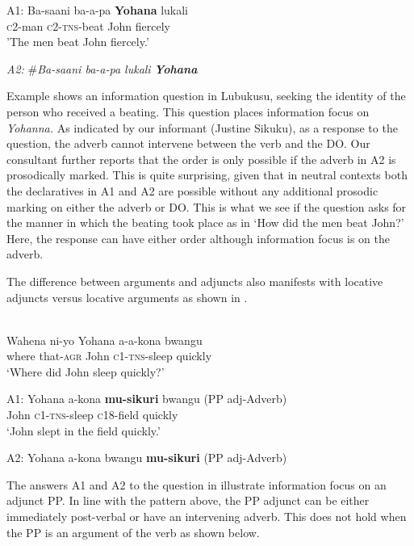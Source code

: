 \documentclass[output=paper]{langsci/langscibook}
\begin{document}
\ea\label{ex:}
\gll A1:  Ba-saani  ba-a-pa  \textbf{{Yohana}}{  lukali}      \\
       \textsc{c}2-man   \textsc{c2-tns}-beat   John     fiercely\\
\glt    'The men beat John fiercely.'

\textit{A2:}  \#\textit{Ba-saani  ba-a-pa  lukali}    \textbf{\textit{Yohana}}    
\z


Example  shows an information question in Lubukusu, seeking the identity of the person who received a beating. This question places information focus on \textit{Yohanna.} As indicated by our informant (Justine Sikuku), as a response to the question, the adverb cannot intervene between the verb and the DO. Our consultant further reports that the order is only possible if the adverb in A2 is prosodically marked. This is quite surprising, given that in neutral contexts both the declaratives in A1 and A2 are possible without any additional prosodic marking on either the adverb or DO. This is what we see if the question asks for the manner in which the beating took place as in ‘How did the men beat John?’ Here, the response can have either order although information focus is on the adverb. 

The difference between arguments and adjuncts also manifests with locative adjuncts versus locative arguments as shown in .  


\ea\label{ex:}
  \\
\gll Wahena  ni-yo    Yohana  a-a-kona  bwangu \\
where     that-\textsc{agr}   John     \textsc{c1-tns}-sleep  quickly \\
\glt ‘Where did John sleep quickly?’ \\
\z

\ea\label{ex:}
\gll A1:  {Yohana  a-kona}    \textbf{{mu-sikuri}}{   bwangu}  (PP adj-Adverb) \\
       John     \textsc{c1-tns}-sleep  \textsc{c}18-field   quickly   \\
\glt   ‘John slept in the field quickly.’

 A2:  Yohana  a-kona    bwangu  \textbf{mu-sikuri}  (PP adj-Adverb)\\
\z


The answers A1 and A2 to the question in  illustrate information focus on an adjunct PP. In line with the pattern above, the PP adjunct can be either immediately post-verbal or have an intervening adverb. This does not hold when the PP is an argument of the verb as shown below.  
\end{document}
